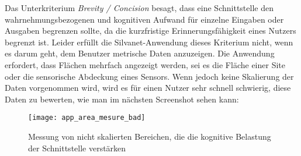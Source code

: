 Das Unterkriterium \textit{Brevity / Concision} besagt, dass eine Schnittstelle den wahrnehmungsbezogenen und kognitiven Aufwand für einzelne Eingaben oder Ausgaben begrenzen sollte, da die kurzfristige Erinnerungsfähigkeit eines Nutzers begrenzt ist.
Leider erfüllt die Silvanet-Anwendung dieses Kriterium nicht, wenn es darum geht, dem Benutzer metrische Daten anzuzeigen.
Die Anwendung erfordert, dass Flächen mehrfach angezeigt werden, sei es die Fläche einer Site oder die sensorische Abdeckung eines Sensors.
Wenn jedoch keine Skalierung der Daten vorgenommen wird, wird es für einen Nutzer sehr schnell schwierig, diese Daten zu bewerten, wie man im nächsten Screenshot sehen kann:

\begin{figure}[H]
  \centering
  \texttt{[image: app\_area\_mesure\_bad]}
  \caption{Messung von nicht skalierten Bereichen, die die kognitive Belastung der Schnittstelle verstärken}
  \label{fig:app_area_mesure_bad}
\end{figure}

